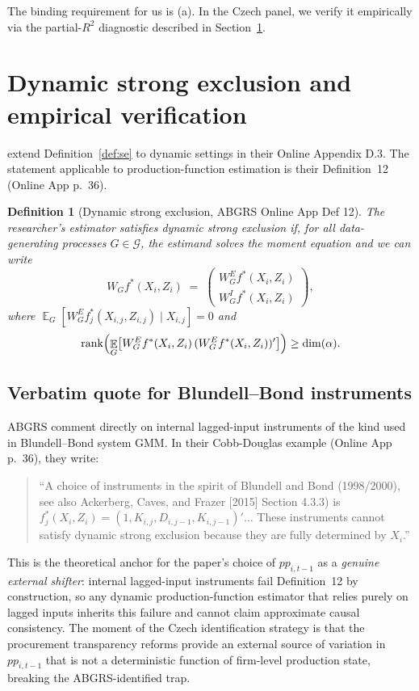 \documentclass[11pt]{article}
\newtheorem{definition}{Definition}
\DeclareMathOperator{\E}{\mathbb{E}}
\DeclareMathOperator{\rank}{rank}
\begin{document}
The binding requirement for us is (a). In the Czech panel, we verify it empirically via the partial-$R^2$ diagnostic described in Section~\ref{sec:dynamic_strong_exclusion}.

\section{Dynamic strong exclusion and empirical verification}\label{sec:dynamic_strong_exclusion}

\citet{ABGRS2025} extend Definition~\ref{def:se} to dynamic settings in their Online Appendix D.3. The statement applicable to production-function estimation is their Definition~12 (Online App p.~36).

\begin{definition}[Dynamic strong exclusion, ABGRS Online App Def 12]\label{def:dyn_se}
The researcher's estimator satisfies \emph{dynamic strong exclusion} if, for all data-generating processes $G \in \mathcal{G}$, the estimand solves the moment equation and we can write
\begin{equation}\label{eq:dyn_se}
W_G f^*(X_i,Z_i) \;=\; \begin{pmatrix} W_G^E f^*(X_i,Z_i) \\ W_G^I f^*(X_i,Z_i) \end{pmatrix},
\end{equation}
where $\E_G[W_G^E f_j^*(X_{i,j},Z_{i,j}) \mid X_{i,j}] = 0$ and
\begin{equation}\label{eq:rank_condition}
\rank\Bigl(\E_G\bigl[W_G^E f^*(X_i,Z_i)\,(W_G^E f^*(X_i,Z_i))'\bigr]\Bigr) \geq \dim(\alpha).
\end{equation}
\end{definition}

\subsection{Verbatim quote for Blundell--Bond instruments}

ABGRS comment directly on internal lagged-input instruments of the kind used in Blundell--Bond system GMM. In their Cobb-Douglas example (Online App p.~36), they write:
\begin{quote}
``A choice of instruments in the spirit of Blundell and Bond (1998/2000), see also Ackerberg, Caves, and Frazer [2015] Section 4.3.3) is $f_j^*(X_i,Z_i) = (1, K_{i,j}, D_{i,j-1}, K_{i,j-1})'\ldots$ These instruments cannot satisfy dynamic strong exclusion because they are fully determined by $X_i$.''
\end{quote}
This is the theoretical anchor for the paper's choice of $pp_{i,t-1}$ as a \emph{genuine external shifter}: internal lagged-input instruments fail Definition~12 by construction, so any dynamic production-function estimator that relies purely on lagged inputs inherits this failure and cannot claim approximate causal consistency. The moment of the Czech identification strategy is that the procurement transparency reforms provide an external source of variation in $pp_{i,t-1}$ that is not a deterministic function of firm-level production state, breaking the ABGRS-identified trap.
\end{document}
